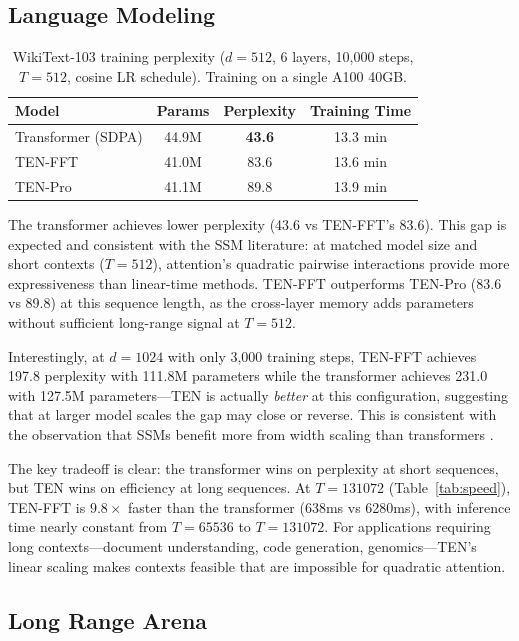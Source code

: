 \documentclass{article}
\begin{document}
\subsection{Language Modeling}

\begin{table}[h]
\centering
\caption{WikiText-103 training perplexity ($d = 512$, 6 layers, 10,000 steps, $T = 512$, cosine LR schedule). Training on a single A100 40GB.}
\label{tab:lm}
\begin{tabular}{lccc}
\toprule
Model & Params & Perplexity & Training Time \\
\midrule
Transformer (SDPA) & 44.9M & \textbf{43.6} & 13.3 min \\
TEN-FFT & 41.0M & 83.6 & 13.6 min \\
TEN-Pro & 41.1M & 89.8 & 13.9 min \\
\bottomrule
\end{tabular}
\end{table}

The transformer achieves lower perplexity (43.6 vs TEN-FFT's 83.6). This gap is expected and consistent with the SSM literature: at matched model size and short contexts ($T = 512$), attention's quadratic pairwise interactions provide more expressiveness than linear-time methods. TEN-FFT outperforms TEN-Pro (83.6 vs 89.8) at this sequence length, as the cross-layer memory adds parameters without sufficient long-range signal at $T = 512$.

Interestingly, at $d = 1024$ with only 3,000 training steps, TEN-FFT achieves 197.8 perplexity with 111.8M parameters while the transformer achieves 231.0 with 127.5M parameters---TEN is actually \emph{better} at this configuration, suggesting that at larger model scales the gap may close or reverse. This is consistent with the observation that SSMs benefit more from width scaling than transformers \cite{gu2023mamba}.

The key tradeoff is clear: the transformer wins on perplexity at short sequences, but TEN wins on efficiency at long sequences. At $T = 131072$ (Table~\ref{tab:speed}), TEN-FFT is $9.8\times$ faster than the transformer (638ms vs 6280ms), with inference time nearly constant from $T = 65536$ to $T = 131072$. For applications requiring long contexts---document understanding, code generation, genomics---TEN's linear scaling makes contexts feasible that are impossible for quadratic attention.

\subsection{Long Range Arena}
\end{document}
